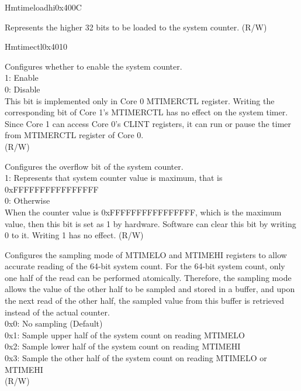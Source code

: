 \begin{register}{H}{mtimeloadhi}{0x400C}\label{regdesc:CLINTMTIMELOADHIREG}
%
\regnewline%
\begin{regdesc}
\begin{reglist}
\label{fielddesc:CLINTMTIMELOADHI}\item [MTIME\_LOADHI] Represents the higher 32 bits to be loaded to the system counter. (R/W)
\end{reglist}
\end{regdesc}
\end{register}

\begin{register}{H}{mtimectl}{0x4010}\label{regdesc:CLINTMTIMECTLREG}
%
%
%
%
\regnewline%
\begin{regdesc}
\begin{reglist}
\label{fielddesc:CLINTMTIMECTLEN}\item [MTIME\_EN] Configures whether to enable the system counter. \\
1: Enable\\
0: Disable\\
This bit is implemented only in Core 0 MTIMERCTL register. Writing the corresponding bit of Core 1's MTIMERCTL has no effect on the system timer. Since Core 1 can access Core 0's CLINT registers, it can run or pause the timer from MTIMERCTL register of Core 0. \\
(R/W)
\label{fielddesc:CLINTMTIMECTLOVF}\item [MTIME\_OVF] Configures the overflow bit of the system counter. \\
1: Represents that system counter value is maximum, that is 0xFFFFFFFFFFFFFFFF\\
0: Otherwise\\
When the counter value is 0xFFFFFFFFFFFFFFFF, which is the maximum value, then this bit is set as 1 by hardware. Software can clear this bit by writing 0 to it. Writing 1 has no effect.
(R/W)
\label{fielddesc:CLINTMTIMECTLSAM}\item [MTIME\_SAM] Configures the sampling mode of MTIMELO and MTIMEHI registers to allow accurate reading of the 64-bit system count. For the 64-bit system count, only one half of the read can be performed atomically. Therefore, the sampling mode allows the value of the other half to be sampled and stored in a buffer, and upon the next read of the other half, the sampled value from this buffer is retrieved instead of the actual counter. \\
0x0: No sampling (Default)\\
0x1: Sample upper half of the system count on reading MTIMELO\\
0x2: Sample lower half of the system count on reading MTIMEHI\\
0x3: Sample the other half of the system count on reading MTIMELO or MTIMEHI\\
(R/W)
\end{reglist}
\end{regdesc}
\end{register}

